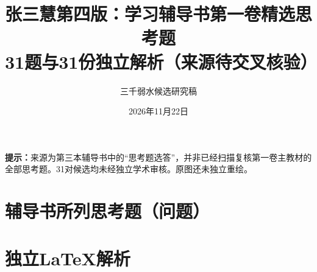\documentclass[UTF8,a4paper,11pt]{ctexart}
\title{张三慧第四版：学习辅导书第一卷精选思考题\\31题与31份独立解析（来源待交叉核验）}
\author{三千弱水候选研究稿}
\date{2026年11月22日}
\begin{document}
\maketitle
\noindent\textbf{提示：}来源为第三本辅导书中的“思考题选答”，并非已经扫描复核第一卷主教材的全部思考题。31对候选均未经独立学术审核。原图还未独立重绘。
\tableofcontents
\clearpage
\part*{辅导书所列思考题（问题）}











\clearpage
\part*{独立LaTeX解析}











\end{document}
